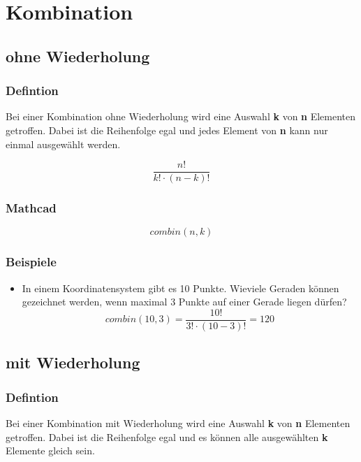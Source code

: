 \documentclass[a4paper,10pt]{article}
\begin{document}
\section{Kombination}
\subsection{ohne Wiederholung}
\subsubsection{Defintion}
Bei einer Kombination ohne Wiederholung wird eine Auswahl \textbf{k} von \textbf{n}
Elementen getroffen. Dabei ist die Reihenfolge egal und jedes Element
von \textbf{n} kann nur einmal ausgewählt werden.

\begin{equation}
  \frac{n!}{k! \cdot (n - k)!}
\end{equation}

\subsubsection{Mathcad}
\begin{equation}
  \label{eq:14}
  combin(n, k)
\end{equation}

\subsubsection{Beispiele}
\begin{itemize}
\item {
    In einem Koordinatensystem gibt es 10 Punkte. Wieviele Geraden
    können gezeichnet werden, wenn maximal 3 Punkte auf einer Gerade
    liegen dürfen?
    \begin{equation}
      \label{eq:13}
      combin(10, 3) = \frac{10!}{3! \cdot (10 - 3)!} = 120
    \end{equation}
  }
\end{itemize}

\subsection{mit Wiederholung}
\subsubsection{Defintion}
Bei einer Kombination mit Wiederholung wird eine Auswahl \textbf{k} von \textbf{n}
Elementen getroffen. Dabei ist die Reihenfolge egal und es können alle
ausgewählten \textbf{k} Elemente gleich sein.
\end{document}
